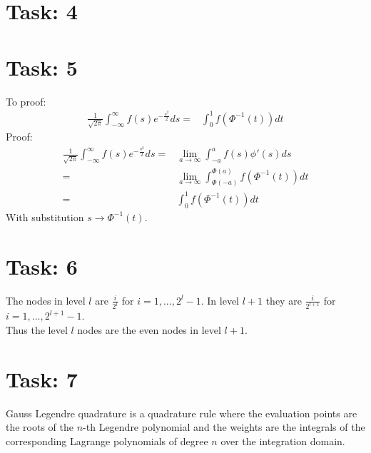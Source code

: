 \documentclass{article}
\begin{document}
\section*{Task: 4}  %
\begin{figure}[htbp]
  \centering
\end{figure}

\section*{Task: 5}

\noindent To proof:
\begin{align*}
 \frac{1}{\sqrt{2 \pi}} \int_{-\infty}^\infty f(s)e^{-\frac{s^2}{2}}ds =& \int_{0}^1 f(\Phi^{-1}(t))dt
\end{align*}
Proof:
\begin{align*}
 \frac{1}{\sqrt{2 \pi}} \int_{-\infty}^\infty f(s)e^{-\frac{s^2}{2}}ds =& \lim_{a\rightarrow \infty}\int_{-a}^a f(s) \phi '(s)ds\\
  =& \lim_{a\rightarrow \infty}\int_{\Phi(-a)}^{\Phi(a)} f(\Phi^{-1}(t)) dt\\
  =& \int_{0}^{1} f(\Phi^{-1}(t)) dt
\end{align*}
With substitution $s\rightarrow \Phi^{-1}(t)$.
{\flushright{$\qed$}}

\section*{Task: 6}

The nodes in level $l$ are $\frac{i}{2^l}$ for $i=1,...,2^l-1$.
In level $l + 1$ they are $\frac{i}{2^{l+1}}$ for $i=1,...,2^{l+1}-1$.\\
Thus the level $l$ nodes are the even nodes in level $l+1$.

\section*{Task: 7}

\noindent Gauss Legendre quadrature is a quadrature rule where the evaluation points are the roots of the
$n$-th Legendre polynomial and the weights are the integrals of the corresponding Lagrange polynomials of degree $n$ over the integration domain.\\
\end{document}
